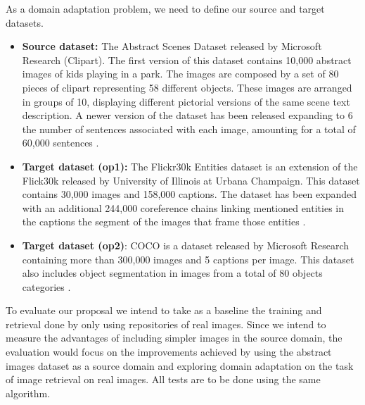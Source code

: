 \documentclass[11pt]{article}
\begin{document}
As a domain adaptation problem, we need to define our source and target datasets. 

\begin{itemize}
\item \textbf{Source dataset:} The Abstract Scenes Dataset released by Microsoft Research (Clipart). The first version of this dataset contains 10,000 abstract images of kids playing in a park. The images are composed by a set of 80 pieces of clipart representing 58 different objects. These images are arranged in groups of 10, displaying different pictorial versions of the same scene text description. A newer version of the dataset has been released expanding to 6 the number of sentences associated with each image, amounting for a total of 60,000 sentences \cite{Zitnick_2013_ICCV_Workshops}. 
\item \textbf{Target dataset (op1):} The Flickr30k Entities dataset is an extension of the Flick30k released by University of Illinois at Urbana Champaign. This dataset contains 30,000 images and 158,000 captions. The dataset has been expanded with an additional 244,000 coreference chains linking mentioned entities in the captions the segment of the images that frame those entities \cite{DBLP:journals/corr/PlummerWCCHL15}. 
\item \textbf{Target dataset (op2)}: COCO is a dataset released by Microsoft Research containing more than 300,000 images and 5 captions per image. This dataset also includes object segmentation in images from a total of 80 objects categories \cite{DBLP:journals/corr/LinMBHPRDZ14}. 
\end{itemize}


To evaluate our proposal we intend to take as a baseline the training and retrieval done by only using repositories of real images. Since we intend to measure the advantages of including simpler images in the source domain, the evaluation would focus on the improvements achieved by using the abstract images dataset as a source domain and exploring domain adaptation on the task of image retrieval on real images. All tests are to be done using the same algorithm. 



\nocite{*}


\end{document}
